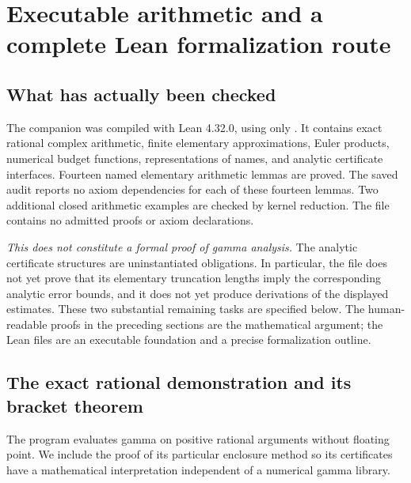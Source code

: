\section{Executable arithmetic and a complete Lean formalization route}
\label{sec:formalization}

\subsection{What has actually been checked}

The companion  was compiled with Lean
4.32.0, using only . It contains exact rational complex
arithmetic, finite elementary approximations, Euler products, numerical
budget functions, representations of names, and analytic certificate
interfaces. Fourteen named elementary arithmetic lemmas are proved.
The saved  audit reports no axiom dependencies for
each of these fourteen lemmas. Two additional closed arithmetic examples
are checked by kernel reduction. The file contains no admitted proofs
or axiom declarations.

\emph{This does not constitute a formal proof of gamma analysis.}
The analytic certificate structures are uninstantiated obligations.
In particular, the file does not yet prove that its elementary
truncation lengths imply the corresponding analytic error bounds, and
it does not yet produce  derivations of the displayed
estimates. These two substantial remaining tasks are specified below.
The human-readable proofs in the preceding sections are the mathematical
argument; the Lean files are an executable foundation and a precise
formalization outline.

\subsection{The exact rational demonstration and its bracket theorem}

The program  evaluates gamma on positive
rational arguments without floating point. We include the proof of its
particular enclosure method so its certificates have a mathematical
interpretation independent of a numerical gamma library.

